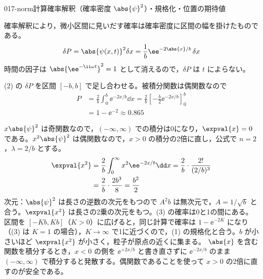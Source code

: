 \documentclass[uplatex,dvipdfmx,a4paper,11pt]{jsarticle}
\begin{document}
\begin{mondai}{017-norm}{計算}{確率解釈（確率密度 $\abs{\psi}^{2}$）・規格化・位置の期待値}
\begin{tadashii}
 確率解釈により，微小区間に見いだす確率は確率密度に区間の幅を掛けたものである。
\[
  \delta P=\abs{\psi(x,t)}^{2}\delta x=\frac{1}{b}\ee^{-2\abs{x}/b}\,\delta x
\]
時間の因子は $\abs{\ee^{-\ii\omega t}}^{2}=1$ として消えるので，$\delta P$ は $t$ によらない。

 (2) の $\delta P$ を区間 $[-b,b]$ で足し合わせる。被積分関数は偶関数なので
\begin{align*}
  P&=\frac{2}{b}\int_{0}^{b}\ee^{-2x/b}\dd x
   =\frac{2}{b}\left[-\frac{b}{2}\ee^{-2x/b}\right]_{0}^{b}\\
  &=1-\ee^{-2}\approx\num{0.865}
\end{align*}

 $x\abs{\psi}^{2}$ は奇関数なので，$(-\infty,\infty)$ での積分は0になり，$\expval{x}=0$ である。$x^{2}\abs{\psi}^{2}$ は偶関数なので，$x>0$ の積分の2倍に直し，公式で $n=2$，$\lambda=2/b$ とする。
\begin{align*}
  \expval{x^{2}}
  &=\frac{2}{b}\int_{0}^{\infty}x^{2}\ee^{-2x/b}\dd x
   =\frac{2}{b}\cdot\frac{2!}{(2/b)^{3}}\\
  &=\frac{2}{b}\cdot\frac{2b^{3}}{8}=\frac{b^{2}}{2}
\end{align*}
\kenzan 次元：$\abs{\psi}^{2}$ は長さの逆数の次元をもつので $A^{2}b$ は無次元で，$A=1/\sqrt{b}$ と合う。$\expval{x^{2}}$ は長さの2乗の次元をもつ。(3) の確率は0と1の間にある。区間を $[-Kb,Kb]$（$K>0$）に広げると，同じ計算で確率は $1-\ee^{-2K}$ になり（(3) は $K=1$ の場合），$K\to\infty$ で1に近づくので，(1) の規格化と合う。$b$ が小さいほど $\expval{x^{2}}$ が小さく，粒子が原点の近くに集まる。
\tsumazuki $\abs{x}$ を含む関数を積分するとき，$x<0$ の側を $\ee^{+2x/b}$ と書き直さずに $\ee^{-2x/b}$ のまま $(-\infty,\infty)$ で積分すると発散する。偶関数であることを使って $x>0$ の2倍に直すのが安全である。
\end{tadashii}
\end{mondai}
\end{document}
